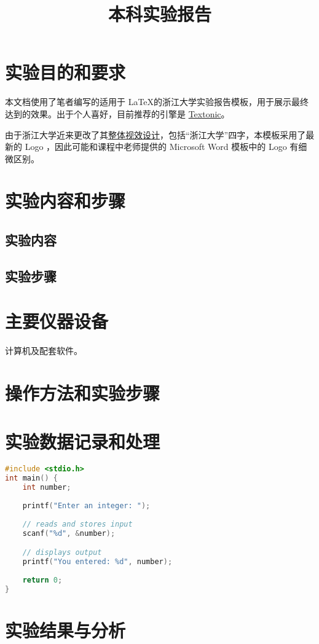 \documentclass{zjureport}
\title{本科实验报告}
\date{\zhtoday}
\begin{document}
\makecover %
\makeheader

\section{实验目的和要求}
本文档使用了笔者编写的适用于 \LaTeX 的浙江大学实验报告模板，用于展示最终达到的效果。出于个人喜好，目前推荐的引擎是 \href{https://github.com/tectonic-typesetting/tectonic/}{Textonic}。

由于浙江大学近来更改了其\href{https://www.zju.edu.cn/572/list.htm}{整体视效设计}，包括``浙江大学''四字，本模板采用了最新的 Logo ，因此可能和课程中老师提供的 Microsoft Word 模板中的 Logo 有细微区别。

\section{实验内容和步骤}

\subsection{实验内容}

\subsection{实验步骤}

\section{主要仪器设备}
计算机及配套软件。

\section{操作方法和实验步骤}

\section{实验数据记录和处理}

\begin{lstlisting}[language=C]
#include <stdio.h>
int main() {   
    int number;
   
    printf("Enter an integer: ");  
    
    // reads and stores input
    scanf("%d", &number);

    // displays output
    printf("You entered: %d", number);
    
    return 0;
}
\end{lstlisting}

\section{实验结果与分析}
\end{document}
